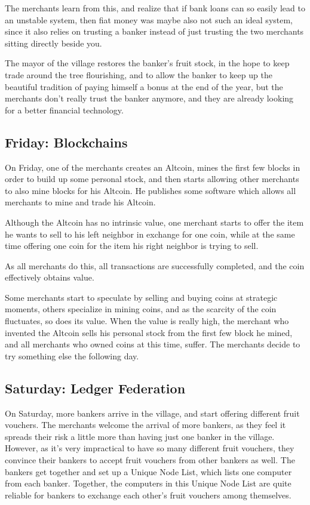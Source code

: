 \documentclass[11pt,twoside,a4paper]{article}
\begin{document}
The merchants learn from this, and realize that if bank loans can so easily lead to an unstable system, then fiat money was maybe also not such an ideal system, since it also relies on trusting a banker instead of just trusting the two merchants sitting directly beside you.

The mayor of the village restores the banker's fruit stock, in the hope to keep trade around the tree flourishing, and to allow the banker to keep up the beautiful tradition of paying himself a bonus at the end of the year, but the merchants don't really trust the banker anymore, and they are already looking for a better financial technology.

\subsection{Friday: Blockchains}
On Friday, one of the merchants creates an Altcoin, mines the first few blocks in order to build up some personal stock, and then starts allowing other merchants to also mine blocks for his Altcoin. He publishes some software which allows all merchants to mine and trade his Altcoin.

Although the Altcoin has no intrinsic value, one merchant starts to offer the item he wants to sell to his left neighbor in exchange for one coin, while at the same time offering one coin for the item his right neighbor is trying to sell.

As all merchants do this, all transactions are successfully completed, and the coin effectively obtains value.

Some merchants start to speculate by selling and buying coins at strategic moments, others specialize in mining coins, and as the scarcity of
the coin fluctuates, so does its value. When the value is really high, the merchant who invented the Altcoin sells his personal stock from the first few block he mined, and all merchants who owned coins at this time, suffer. The merchants decide to try something else the following day.

\subsection{Saturday: Ledger Federation}
On Saturday, more bankers arrive in the village, and start offering different fruit vouchers. The merchants welcome the arrival of more bankers, as they feel it spreads their risk a little more than having just one banker in the village. However, as it's very impractical to have so many different fruit vouchers, they convince their bankers to accept fruit vouchers from other bankers as well. The bankers get together and set up a Unique Node List, which lists one computer from each banker. Together, the computers in this Unique Node List are quite reliable for bankers to exchange each other's fruit vouchers among themselves.
\end{document}
